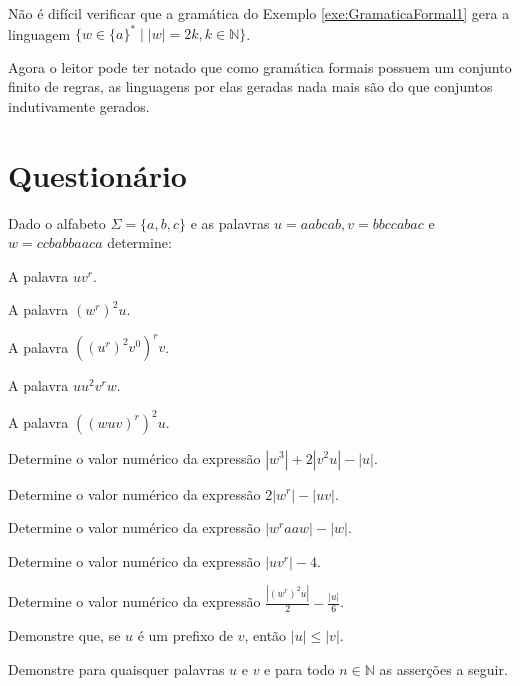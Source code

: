 \begin{exemplo}
	Não é difícil verificar que a gramática do Exemplo \ref{exe:GramaticaFormal1} gera a linguagem $\{w \in \{a\}^* \mid |w| = 2k, k \in \mathbb{N}\}$.
\end{exemplo}

Agora o leitor pode ter notado que como gramática formais possuem um conjunto finito de regras, as linguagens por elas geradas nada mais são do que conjuntos indutivamente gerados.

\section{Questionário}\label{sec:Questionario1part1}

\begin{questao}\label{exer:LF1}
	Dado o alfabeto $\Sigma = \{a, b, c\}$ e as palavras $u = aabcab, v = bbccabac$ e $w = ccbabbaaca$ determine:
\end{questao}

\begin{exerList}
	\item A palavra $uv^r$.
	\item A palavra $(w^r)^2u$.
	\item A palavra $((u^r)^2v^0)^rv$.
	\item A palavra $uu^2v^rw$.
	\item A palavra $((wuv)^r)^2u$.
	\item Determine o valor numérico da expressão $|w^3| + 2|v^2u| - |u|$.
	\item Determine o valor numérico da expressão $2|w^r| - |uv|$.
	\item Determine o valor numérico da expressão $|w^raaw| - |w|$.
	\item Determine o valor numérico da expressão $|uv^r| - 4$.
	\item Determine o valor numérico da expressão $\frac{|(w^r)^2u|}{2} - \frac{|u|}{6}$.
\end{exerList}


\begin{questao}\label{exer:LF2.0}
	Demonstre que, se $u$ é um prefixo de $v$, então $|u| \leq |v|$.
\end{questao}


\begin{questao}\label{exer:LF2}
	Demonstre para quaisquer palavras $u$ e $v$ e para todo $n \in \mathbb{N}$ as asserções a seguir.
\end{questao}

